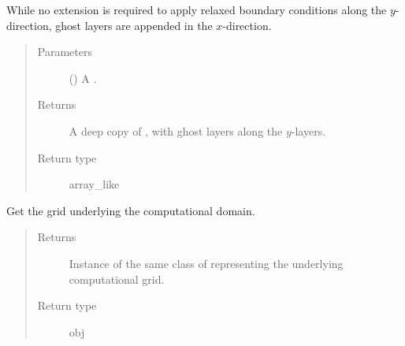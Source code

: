 \documentclass[letterpaper,10pt,english]{sphinxmanual}
\begin{document}
\begin{fulllineitems}

\begin{fulllineitems}
\label{\detokenize{api:tasmania.dycore.horizontal_boundary_relaxed.RelaxedYZ.from_physical_to_computational_domain}}
While no extension is required to apply relaxed boundary conditions along the \(y\)-direction,
 ghost layers are appended in the \(x\)-direction.
\begin{quote}\begin{description}
\item[{Parameters}] \leavevmode
{} () \textendash{} A .

\item[{Returns}] \leavevmode
A deep copy of , with  ghost layers along the \(y\)-layers.

\item[{Return type}] \leavevmode
array\_like

\end{description}\end{quote}

\end{fulllineitems}


\begin{fulllineitems}
\label{\detokenize{api:tasmania.dycore.horizontal_boundary_relaxed.RelaxedYZ.get_computational_grid}}
Get the  grid underlying the computational domain.
\begin{quote}\begin{description}
\item[{Returns}] \leavevmode
Instance of the same class of 
representing the underlying computational grid.

\item[{Return type}] \leavevmode
obj


\end{description}
\end{quote}
\end{fulllineitems}
\end{fulllineitems}
\end{document}
